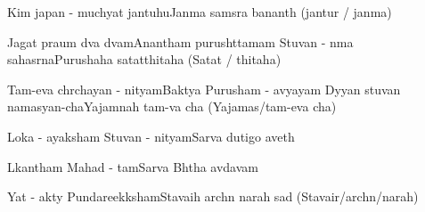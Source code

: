 \documentclass[20pt]{article}
\begin{document}
{Kim japan - muchyat jantuhu}{Janma samsra bananth (jantur / janma)}

{Jagat praum dva dvam}{Anantham purushttamam} 
{Stuvan - nma sahasrna}{Purushaha satatthitaha (Satat / thitaha)}

\newpage
\slokash
{Tam-eva chrchayan - nityam}{Baktya Purusham - avyayam}
{Dyyan stuvan namasyan-cha}{Yajamnah tam-va cha (Yajamas/tam-eva cha)}


{Loka - ayaksham Stuvan - nityam}{Sarva dutigo aveth}

{Lkantham Mahad - tam}{Sarva Bhtha avdavam}

{Yat - akty Pundareekksham}{Stavaih archn narah sad (Stavair/archn/narah)}
\end{document}
